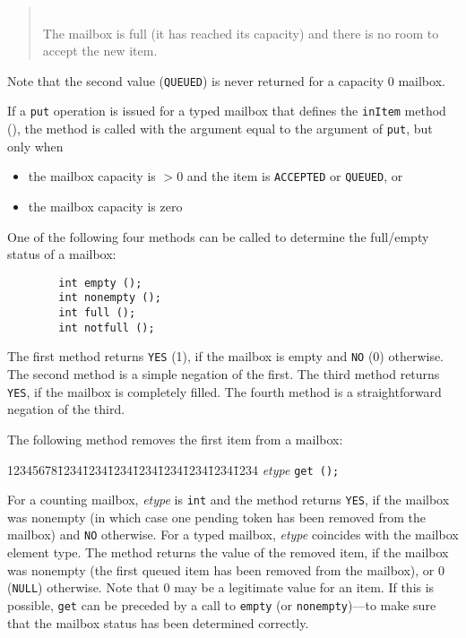 \begin{quote}
\noindent{}\\ \hspace{0in}
The mailbox is full (it has reached its capacity)
and there is no room to accept the new item.
\end{quote}\medskip

Note that the second value ({\tt QUEUED}) is never returned for a
capacity 0 mailbox.

If a {\tt put} operation is issued for a typed mailbox that defines the
{\tt inItem} method (), the method is called
with the argument equal to the argument of {\tt put}, but only when
\begin{itemize}
\item
the mailbox capacity is $> 0$ and
the item is {\tt ACCEPTED} or {\tt QUEUED}, or
\item
the mailbox capacity is zero
\end{itemize}

One of the following four methods can be called to determine the full/empty
status of a mailbox:
\begin{verbatim}
        int empty ();
        int nonempty ();
        int full ();
        int notfull ();
\end{verbatim}
The first method returns {\tt YES} (1), if the mailbox is empty and {\tt NO}
(0) otherwise.
The second method is a simple negation of the first.
The third method returns {\tt YES}, if the mailbox is completely filled.
The fourth method is a straightforward negation of the third.

The following method removes the first item from a mailbox:
{\tt\begin{tabbing}
12345678\=1234\=1234\=1234\=1234\=1234\=1234\=1234\=1234\kill
\> {\em etype\/} {\tt get (); }
\end{tabbing}}
For a counting mailbox, {\em etype\/} is {\tt int}
and the method returns {\tt YES}, if the mailbox was
nonempty (in which case one pending token has been removed from the mailbox)
and {\tt NO} otherwise.
For a typed mailbox, {\em etype} coincides with the mailbox element type.
The method returns the value of the
removed item, if the mailbox was
nonempty (the first queued item has been removed from the mailbox), or
0 ({\tt NULL}) otherwise.
Note that 0 may be a legitimate value for an item.
If this is possible,
{\tt get} can be preceded
by a call to {\tt empty} (or {\tt nonempty})---to make sure that the mailbox
status has been determined correctly.

